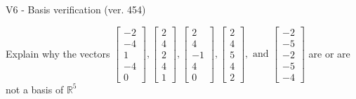 \begin{exercise}
  \begin{exerciseTitle}V6 - Basis verification (ver. 454)\end{exerciseTitle}
  \begin{exerciseStatement}
    Explain why the vectors \(\left[\begin{array}{r}
-2 \\
-4 \\
1 \\
-4 \\
0
\end{array}\right] , \left[\begin{array}{r}
2 \\
4 \\
2 \\
4 \\
1
\end{array}\right] , \left[\begin{array}{r}
2 \\
4 \\
-1 \\
4 \\
0
\end{array}\right] , \left[\begin{array}{r}
2 \\
4 \\
5 \\
4 \\
2
\end{array}\right] , \text{ and } \left[\begin{array}{r}
-2 \\
-5 \\
-2 \\
-5 \\
-4
\end{array}\right]\) are or are not a basis of \(\mathbb{R}^5\)	



\end{exerciseStatement}
\end{exercise}
